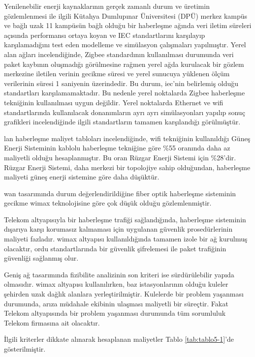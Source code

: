 Yenilenebilir enerji kaynaklarının gerçek zamanlı durum ve üretimin gözlemlenmesi ile ilgili Kütahya Dumlupınar Üniversitesi (DPÜ) merkez kampüs ve bağlı uzak 11 kampüsün bağlı olduğu bir haberleşme ağında veri iletim süreleri açısında performansı ortaya koyan ve IEC standartlarını karşılayıp karşılamadığını test eden modelleme ve simülasyon çalışmaları yapılmıştır. Yerel alan ağları incelendiğinde, Zigbee standardının kullanılması durumunda veri paket kaybının oluşmadığı görülmesine rağmen yerel ağda kurulacak bir gözlem merkezine iletilen verinin gecikme süresi ve yerel sunucuya yüklenen ölçüm verilerinin süresi 1 saniyenin üzerindedir. Bu durum, \gls{iec}'nin belirlemiş olduğu standartları karşılamamaktadır. Bu nedenle yerel noktalarda Zigbee haberleşme tekniğinin kullanılması uygun değildir. Yerel noktalarda Ethernet ve \gls{wifi} standartlarında kullanılacak donanımların ayrı ayrı simülasyonları yapılıp sonuç grafikleri incelendiğinde ilgili standartların tamamen karşılandığı görülmüştür. 

\gls{lan} haberleşme maliyet tabloları incelendiğinde, \gls{wifi} tekniğinin kullanıldığı Güneş Enerji Sisteminin kablolu haberleşme tekniğine göre \%55 oranında daha az maliyetli olduğu hesaplanmıştır. Bu oran Rüzgar Enerji Sistemi için \%28’dir. Rüzgar Enerji Sistemi, daha merkezi bir topolojiye sahip olduğundan, haberleşme maliyeti güneş enerji sistemine göre daha düşüktür.

\gls{wan} tasarımında durum değerlendirildiğine fiber optik haberleşme sisteminin gecikme \gls{wimax} teknolojisine göre çok düşük olduğu gözlemlenmiştir. 

Telekom altyapısıyla bir haberleşme trafiği sağlandığında, haberleşme sisteminin dışarıya karşı korumasız kalmaması için uygulanan güvenlik prosedürlerinin maliyeti fazladır. \gls{wimax} altyapısı kullanıldığında tamamen izole bir ağ kurulmuş olacaktır, ordu standartlarında bir güvenlik şifrelemesi ile paket trafiğinin güvenliği sağlanmış olur.

Geniş ağ tasarımında fizibilite analizinin son kriteri ise sürdürülebilir yapıda olmasıdır. \gls{wimax} altyapısı kullanılırken, baz istasyonlarının olduğu kuleler şehirden uzak dağlık alanlara yerleştirilmiştir. Kulelerde bir problem yaşanması durumunda, arıza müdahale ekibinin ulaşması maliyetli bir süreçtir. Fakat Telekom altyapısında bir problem yaşanması durumunda tüm sorumluluk Telekom firmasına ait olacaktır. 

İlgili kriterler dikkate alınarak hesaplanan maliyetler  Tablo \ref{tab:tablo5-1}’de gösterilmiştir.

